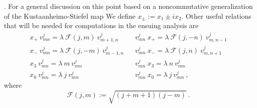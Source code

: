 \documentclass[10pt]{book}
\theoremstyle{break}
\begin{document}
. For a general discussion on this point based on a noncommutative generalization of the Kustaanheimo-Stiefel map %
%
We define $x_\pm := x_1\pm i x_2$. Other useful relations %
that will be needed for computations in the ensuing analysis are%
%
\begin{eqnarray*}
x_+ \ v^j_{mn} = \lambda \ \mathcal{F}(j,m) \ v^j_{m+1, n}  
&& v^j_{mn} \ x_+ = \lambda \ \mathcal{F}(j,-n) \ v^j_{m, n -1} \nonumber \\
x_- \ v^j_{mn} = \lambda \ \mathcal{F}(j,-m) \ v^j_{m-1,n}  
&& v^j_{mn} \ x_- = \lambda \ \mathcal{F}(j,n) \ v^j_{m,n +1} \nonumber \\
x_3 \ v^j_{mn} = \lambda \ m \ v^j_{mn}
&& v^j_{mn} \ x_3 = \lambda \ n \ v^j_{mn} \nonumber \\
x_0 \ v^j_{mn} = \lambda \ j \ v^j_{mn}
&& v^j_{mn} \ x_0 = \lambda \ j \ v^j_{mn} \ , %
\end{eqnarray*}
%
where%
%
\begin{equation*}
\mathcal{F}(j,m):=\sqrt{(j+m+1)(j-m)} \ . %
\end{equation*}


\end{document}
